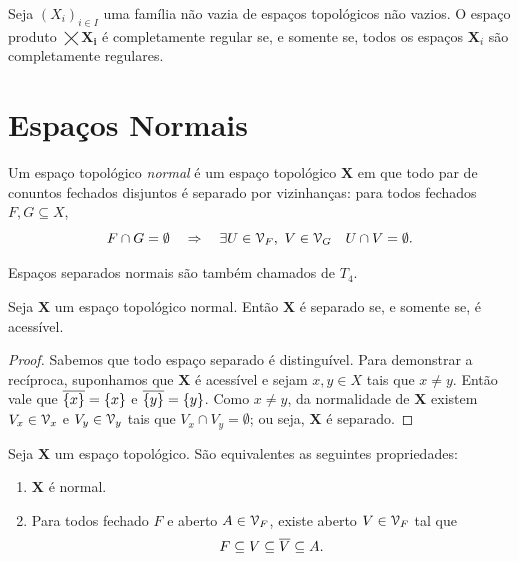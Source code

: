 \begin{prop}
	Seja $(X_i)_{i \in I}$ uma família não vazia de espaços topológicos não vazios. O espaço produto $\bm{\bigtimes X_i}$ é completamente regular se, e somente se, todos os espaços $\bm X_i$ são completamente regulares.
\end{prop}

\section{Espaços Normais}

\begin{defi}
	Um espaço topológico \emph{normal} é um espaço topológico $\bm X$ em que todo par de conuntos fechados disjuntos é separado por vizinhanças: para todos fechados $F,G \subseteq X$,
	\begin{equation*}
	F \cap G = \emptyset \quad \Rightarrow \quad \exists U \in \mathcal{V}_F,\ V \in \mathcal{V}_G \quad U \cap V = \emptyset.
	\end{equation*}
\end{defi}

Espaços separados normais são também chamados de $T_4$.

\begin{prop}
	Seja $\bm X$ um espaço topológico normal. Então $\bm X$ é separado se, e somente se, é acessível.
\end{prop}
\begin{proof}
	Sabemos que todo espaço separado é distinguível. Para demonstrar a recíproca, suponhamos que $\bm X$ é acessível e sejam $x,y \in X$ tais que $x \neq y$. Então vale que $\overline{\{x\}}=\{x\}$ e $\overline{\{y\}}=\{y\}$. Como $x \neq y$, da normalidade de $\bm X$ existem $V_x \in \mathcal{V}_x$ e $V_y \in \mathcal{V}_y$ tais que $V_x \cap V_y = \emptyset$; ou seja, $\bm X$ é separado.
\end{proof}

\begin{prop}
	Seja $\bm X$ um espaço topológico. São equivalentes as seguintes propriedades:
	\begin{enumerate}
	\item $\bm X$ é normal.
	\item Para todos fechado $F$ e aberto $A \in \mathcal{V}_F$, existe aberto $V \in \mathcal{V}_F$ tal que
		\begin{equation*}
		F \subseteq V \subseteq \overline{V} \subseteq A.
		\end{equation*}
	\end{enumerate}
\end{prop}

